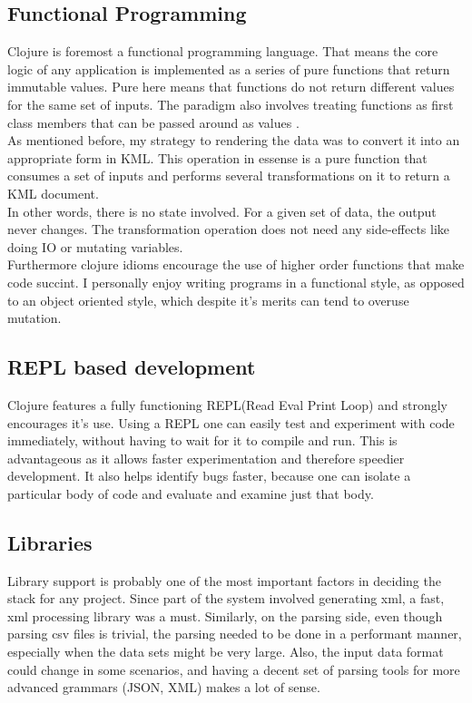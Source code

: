 \subsection{Functional Programming}

Clojure is foremost a functional programming language. That means the core logic of any application is implemented as a series of pure functions that return immutable values. Pure here means that functions do not return different values for the same set of inputs. The paradigm also involves treating functions as first class members that can be passed around as values \citep{joyofclojure}. \\

As mentioned before, my strategy to rendering the data was to convert it into an appropriate form in KML. This operation in essense is a pure function that consumes a set of inputs and performs several transformations on it to return a KML document.\\

In other words, there is no state involved. For a given set of data, the output never changes. The transformation operation does not need any side-effects like doing IO or mutating variables.\\

Furthermore clojure idioms encourage the use of higher order functions that make code succint. I personally enjoy writing programs in a functional style, as opposed to an object oriented style, which despite it's merits can tend to overuse mutation.

\subsection{REPL based development}
Clojure features a fully functioning REPL(Read Eval Print Loop) and strongly encourages it's use. Using a REPL one can easily test and experiment with code immediately, without having to wait for it to compile and run. This is advantageous as it allows faster experimentation and therefore speedier development. It also helps identify bugs faster, because one can isolate a particular body of code and evaluate and examine just that body.

\subsection{Libraries}

Library support is probably one of the most important factors in deciding the stack for any project. Since part of the system involved generating xml, a fast, xml processing library was a must. Similarly, on the parsing side, even though parsing csv files is trivial, the parsing needed to be done in a performant manner, especially when the data sets might be very large. Also, the input data format could change in some scenarios, and having a decent set of parsing tools for more advanced grammars (JSON, XML) makes a lot of sense.\\

